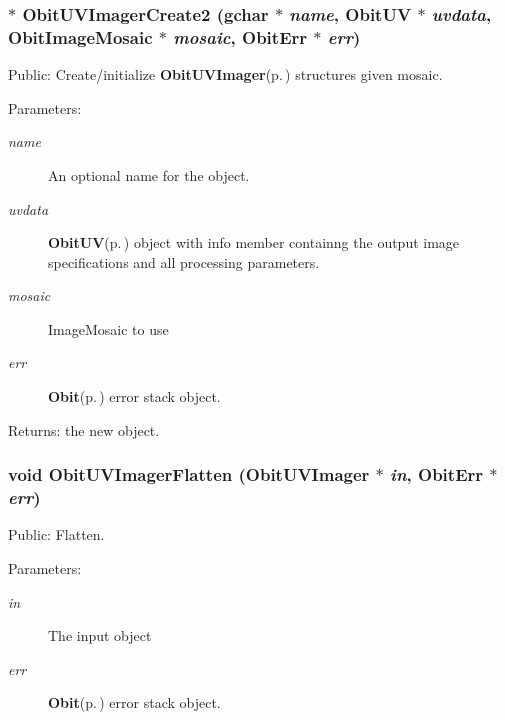 \subsubsection{$\ast$ Obit\-UVImager\-Create2 (gchar $\ast$ {\em name}, {\bf Obit\-UV} $\ast$ {\em uvdata}, {\bf Obit\-Image\-Mosaic} $\ast$ {\em mosaic}, {\bf Obit\-Err} $\ast$ {\em err})}\label{ObitUVImager_8h_a18}


Public: Create/initialize {\bf Obit\-UVImager}{\rm (p.\,\pageref{structObitUVImager})} structures given mosaic. 

\begin{Desc}
\item[Parameters:]
\begin{description}
\item[{\em name}]An optional name for the object. \item[{\em uvdata}]{\bf Obit\-UV}{\rm (p.\,\pageref{structObitUV})} object with info member containng the output image specifications and all processing parameters. \item[{\em mosaic}]Image\-Mosaic to use \item[{\em err}]{\bf Obit}{\rm (p.\,\pageref{structObit})} error stack object. \end{description}
\end{Desc}
\begin{Desc}
\item[Returns:]the new object. \end{Desc}
\subsubsection{\setlength{\rightskip}{0pt plus 5cm}void Obit\-UVImager\-Flatten ({\bf Obit\-UVImager} $\ast$ {\em in}, {\bf Obit\-Err} $\ast$ {\em err})}\label{ObitUVImager_8h_a21}


Public: Flatten. 

\begin{Desc}
\item[Parameters:]
\begin{description}
\item[{\em in}]The input object \item[{\em err}]{\bf Obit}{\rm (p.\,\pageref{structObit})} error stack object. \end{description}
\end{Desc}
